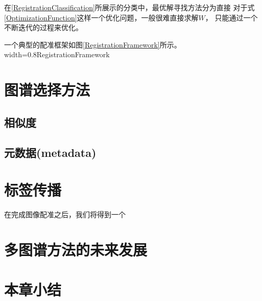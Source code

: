 在\ref{RegistrationClassification}所展示的分类中，最优解寻找方法分为直接
对于式\ref{OptimizationFunction}这样一个优化问题，一般很难直接求解$W$，
只能通过一个不断迭代的过程来优化。

一个典型的配准框架如图\ref{RegistrationFramework}所示。
%
{width=0.8\textwidth}{RegistrationFramework}



\section{图谱选择方法}

\subsection{相似度}
\subsection{元数据(metadata)}

\section{标签传播}
在完成图像配准之后，我们将得到一个




\section{多图谱方法的未来发展}

\section{本章小结}

